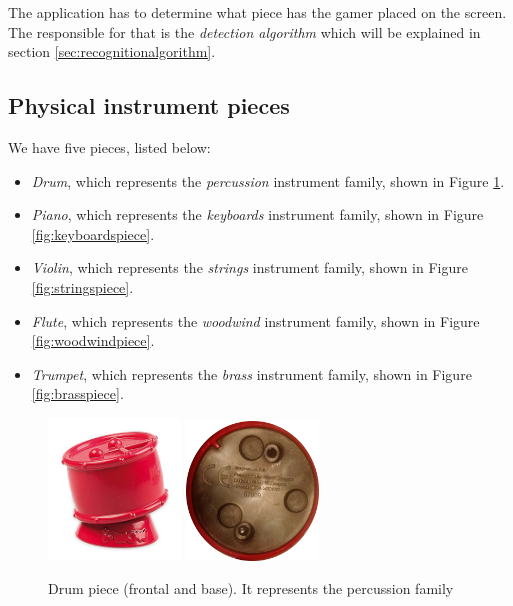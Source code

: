The application has to determine what piece has the gamer placed on the screen. The responsible for that is the \textit{detection algorithm} which will be explained in section \ref{sec:recognitionalgorithm}.

\subsection{Physical instrument pieces}
\label{sec:piecesdetailed}
We have five pieces, listed below:
\begin{itemize}
\item \textit{Drum}, which represents the \textit{percussion} instrument family, shown in Figure \ref{fig:percussionpiece}.
\item \textit{Piano}, which represents the \textit{keyboards} instrument family, shown in Figure \ref{fig:keyboardspiece}.
\item \textit{Violin}, which represents the \textit{strings} instrument family, shown in Figure \ref{fig:stringspiece}.
\item \textit{Flute}, which represents the \textit{woodwind} instrument family, shown in Figure \ref{fig:woodwindpiece}.
\item \textit{Trumpet}, which represents the \textit{brass} instrument family, shown in Figure \ref{fig:brasspiece}.
\end{itemize}

\begin{figure}[ht!]
	\centering
	\includegraphics[width=100pt]{graphics/architecture/pieces/piecePercussion.jpg}
	\vspace{0.6cm}
	\includegraphics[width=100pt]{graphics/architecture/pieces/percussionBase.png}
	\caption{Drum piece (frontal and base). It represents the percussion family}
	\label{fig:percussionpiece}
\end{figure}

